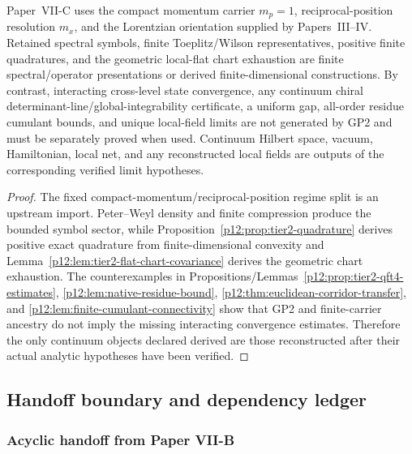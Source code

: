 \documentclass[12pt,a4paper]{article}
\begin{document}
\begin{proposition}
\label{p12:prop:momentum-first-no-lattice}
\label{p12:prop:no-continuum-primitive-inserted}
\label{p12:prop:gp1gp2-generation-principle}
Paper~VII-C uses the compact momentum carrier \(m_p=1\), reciprocal-position resolution \(m_x\), and the Lorentzian orientation supplied by Papers~III--IV.  Retained spectral symbols, finite Toeplitz/Wilson representatives, positive finite quadratures, and the geometric local-flat chart exhaustion are finite spectral/operator presentations or derived finite-dimensional constructions.  By contrast, interacting cross-level state convergence, any continuum chiral determinant-line/global-integrability certificate, a uniform gap, all-order residue cumulant bounds, and unique local-field limits are not generated by GP2 and must be separately proved when used.  Continuum Hilbert space, vacuum, Hamiltonian, local net, and any reconstructed local fields are outputs of the corresponding verified limit hypotheses.
\end{proposition}
\begin{proof}
The fixed compact-momentum/reciprocal-position regime split is an upstream import.  Peter--Weyl density and finite compression produce the bounded symbol sector, while Proposition~\ref{p12:prop:tier2-quadrature} derives positive exact quadrature from finite-dimensional convexity and Lemma~\ref{p12:lem:tier2-flat-chart-covariance} derives the geometric chart exhaustion.  The counterexamples in Propositions/Lemmas~\ref{p12:prop:tier2-qft4-estimates}, \ref{p12:lem:native-residue-bound}, \ref{p12:thm:euclidean-corridor-transfer}, and \ref{p12:lem:finite-cumulant-connectivity} show that GP2 and finite-carrier ancestry do not imply the missing interacting convergence estimates.  Therefore the only continuum objects declared derived are those reconstructed after their actual analytic hypotheses have been verified.
\end{proof}


\subsection{Handoff boundary and dependency ledger}
\label{p12:sec:handoff-dependency-ledger}


\subsubsection{Acyclic handoff from Paper VII-B}
\label{p12:sec:acyclic-handoff}
\end{document}
